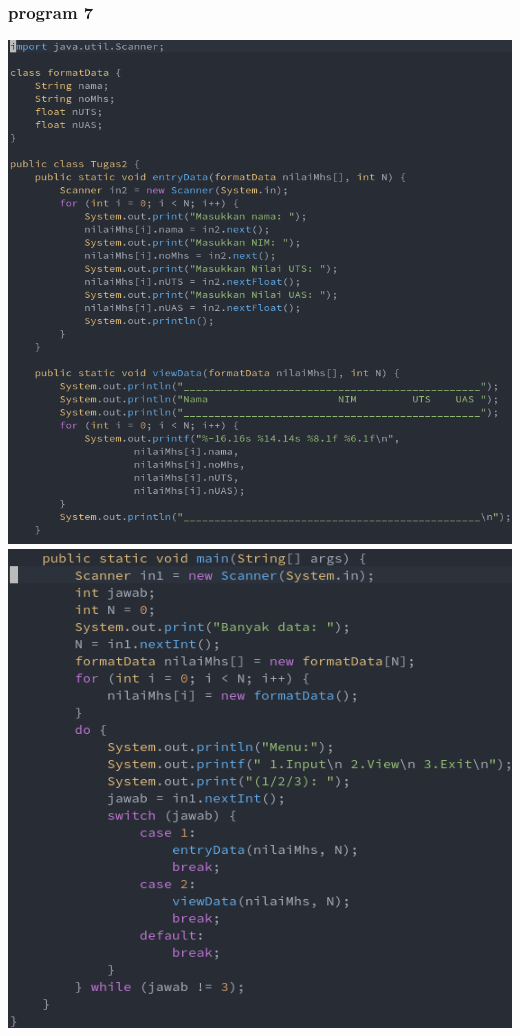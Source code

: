 \documentclass[a4paper,12pt]{article}
\begin{document}
\subsubsection{program 7}
\begin{center}
    \includegraphics[scale=.5]{code12.png} 
    \newpage
    \includegraphics[scale=.5]{code13.png} 
\end{center}
\end{document}
